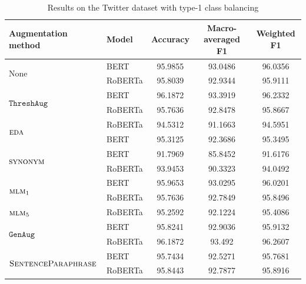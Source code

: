 \documentclass[11pt,a4paper]{article}
\newcommand{\noaug}{$\textrm{None}$}
\newcommand{\senttfpara}{$\textsc{SentenceParaphrase}$}
\newcommand{\eda}{$\textsc{eda}$}
\newcommand{\synonym}{$\textsc{synonym}$}
\newcommand{\mlmone}{$\textsc{mlm}_1$}
\newcommand{\mlmfive}{$\textsc{mlm}_5$}
\newcommand{\genaug}{$\texttt{GenAug}$}
\newcommand{\threshaug}{$\texttt{ThreshAug}$}
\begin{document}
\begin{table}[]
    \small
    \centering
    \begin{tabular}{llccc}
        \toprule
        \textbf{Augmentation method} & \textbf{Model} & \textbf{Accuracy} & \textbf{Macro-averaged F1} & \textbf{Weighted F1} \\
        \midrule
        \multirow{2}{*}{\noaug} & BERT & 95.9855 & 93.0486 & 96.0356 \\
         & RoBERTa & 95.8039 & 92.9344 & 95.9111 \\\midrule
        
        \multirow{2}{*}{\threshaug} & BERT & 96.1872 & 93.3919 & 96.2332 \\
         & RoBERTa & 95.7636 & 92.8478 & 95.8667 \\\cmidrule{2-5}
        \multirow{2}{*}{\eda} & RoBERTa & 94.5312 & 91.1663 & 94.5951 \\
         & BERT & 95.3125 & 92.3686 & 95.3495 \\\midrule
         
        \multirow{2}{*}{\synonym} & BERT & 91.7969 & 85.8452 & 91.6176 \\
         & RoBERTa & 93.9453 & 90.3323 & 94.0492 \\\cmidrule{2-5}
        \multirow{2}{*}{\mlmone} & BERT & 95.9653 & 93.0295 & 96.0201 \\
         & RoBERTa & 95.7636 & 92.7849 & 95.8496 \\\cmidrule{2-5}
        \mlmfive & RoBERTa & 95.2592 & 92.1224 & 95.4086 \\\midrule
         
        \multirow{2}{*}{\genaug} & BERT & 95.8241	& 92.9036 & 95.9132  \\
         & RoBERTa & 96.1872 & 93.492 &	96.2607 \\\midrule
         
        \multirow{2}{*}{\senttfpara} & BERT & 95.7434 & 92.5271 & 95.7681 \\
         & RoBERTa & 95.8443 & 92.7877 & 95.8916 \\
        \bottomrule
    \end{tabular}
    \caption{Results on the Twitter dataset with type-1 class balancing}
    \label{tab:twitter1}
\end{table}
\end{document}
